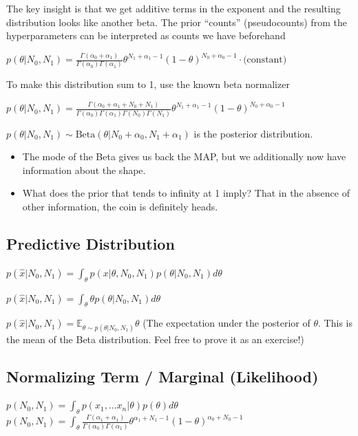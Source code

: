 \documentclass[twoside]{article}
\newcommand\E{\mathbb{E}}
\begin{document}
The key insight is that we get additive terms in the exponent and the resulting distribution looks like another beta. The prior ``counts'' (pseudocounts) from the hyperparameters can be interpreted as counts we have beforehand

$p(\theta|N_0,N_1) = \frac{\Gamma(\alpha_0 + \alpha_1)}{\Gamma(\alpha_0)\Gamma(\alpha_1)} \theta^{N_1 + \alpha_1-1} (1-\theta)^{N_0 + \alpha_0-1} \cdot \textrm{(constant)}$ 

To make this distribution sum to 1, use the known beta normalizer

$p(\theta|N_0,N_1) = \frac{\Gamma(\alpha_0 + \alpha_1 + N_0 + N_1)}{\Gamma(\alpha_0)\Gamma(\alpha_1)\Gamma(N_0)\Gamma(N_1)} \theta^{N_1 + \alpha_1-1} (1-\theta)^{N_0 + \alpha_0-1} $ 

$p(\theta|N_0,N_1) \sim \textrm{Beta}(\theta | N_0 + \alpha_0, N_1 + \alpha_1)$ is the posterior distribution.

\begin{itemize}
\item The mode of the Beta gives us back the MAP, but we additionally now have information about the shape.
\item What does the prior that tends to infinity at 1 imply? That in the absence of other information, the coin is definitely heads. 
\end{itemize}

\subsection{Predictive Distribution}

$p(\hat{x}| N_0, N_1) = \int_\theta p(x|\theta, N_0, N_1) p(\theta | N_0, N_1) d\theta$

$p(\hat{x}| N_0, N_1) = \int_\theta \theta p(\theta | N_0, N_1) d\theta$

$p(\hat{x}| N_0, N_1) = \E_{\theta \sim p(\theta|N_0, N_1)} \theta$ (The expectation under the posterior of $\theta$. This is the mean of the Beta distribution. Feel free to prove it as an exercise!)

\subsection{Normalizing Term / Marginal (Likelihood)}
$p(N_0, N_1) = \int_\theta p(x_1, \hdots x_n | \theta) p(\theta) d\theta$ \\
$p(N_0, N_1) = \int_\theta \frac{\Gamma( \alpha_1 +  \alpha_1)}{\Gamma(\alpha_0)\Gamma(\alpha_1)} \theta^{\alpha_1 + N_1 -1} (1-\theta)^{\alpha_0+N_0-1} $
\end{document}
